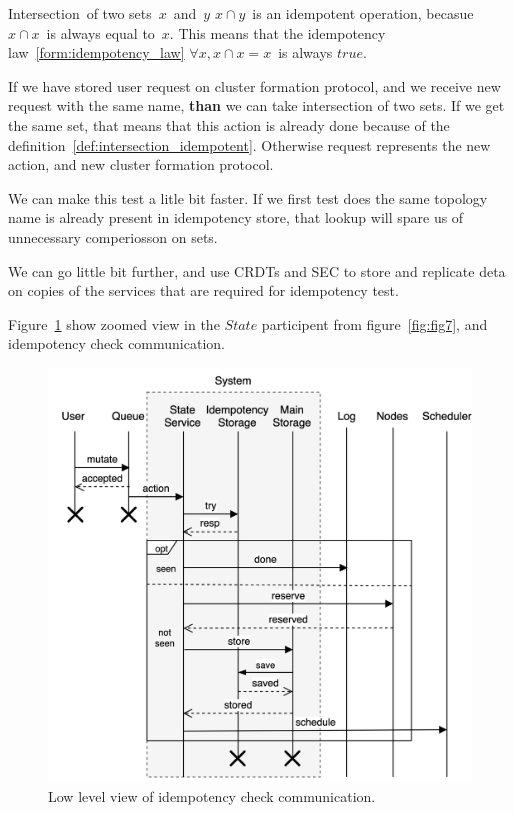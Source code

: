 \begin{definition}\label{def:intersection_idempotent}
	Intersection of two sets $x$ and $y$ $x \cap y$ is an idempotent operation, becasue $x \cap x$ is always equal to $x$. This means that the idempotency law~\ref{form:idempotency_law} $\forall x, x \cap x = x$ is always $true$.
\end{definition}

If we have stored user request on cluster formation protocol, and we receive new request with the same name, \textbf{than} we can take intersection of two sets. If we get the same set, that means that this action is already done because of the definition~\ref{def:intersection_idempotent}. Otherwise request represents the new action, and new cluster formation protocol. 

We can make this test a litle bit faster. If we first test does the same topology name is already present in idempotency store, that lookup will spare us of unnecessary comperiosson on sets.

We can go little bit further, and use CRDTs and SEC to store and replicate deta on copies of the services that are required for idempotency test.

Figure~\ref{fig:fig13} show zoomed view in the $State$ participent from figure~\ref{fig:fig7}, and idempotency check communication.

\begin{figure}[H]
	\begin{center}
		\includegraphics[scale=0.7]{images/Figure13}
	\end{center}
	\vspace{-0.7cm}
	\caption{Low level view of idempotency check communication.}
	\label{fig:fig13}
\end{figure}

